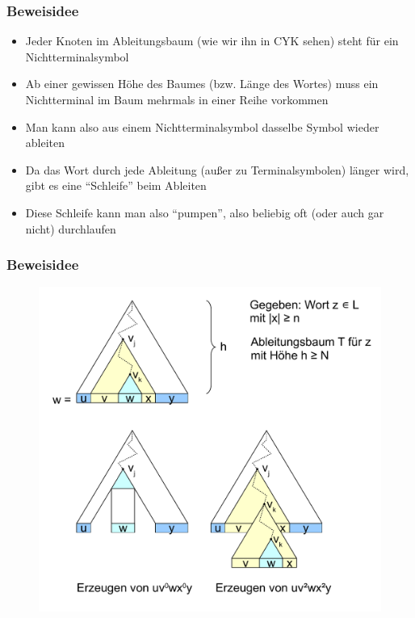 \begin{frame}
	\frametitle{Beweisidee}
	\begin{itemize}
		\item Jeder Knoten im Ableitungsbaum (wie wir ihn in CYK sehen) steht für ein Nichtterminalsymbol
		\item Ab einer gewissen Höhe des Baumes (bzw. Länge des Wortes) muss ein Nichtterminal im Baum mehrmals in einer Reihe vorkommen
		\item Man kann also aus einem Nichtterminalsymbol dasselbe Symbol wieder ableiten
		\item Da das Wort durch jede Ableitung (außer zu Terminalsymbolen) länger wird, gibt es eine "`Schleife"' beim Ableiten
		\item Diese Schleife kann man also "`pumpen"', also beliebig oft (oder auch gar nicht) durchlaufen
	\end{itemize}
\end{frame}

\begin{frame}
	\frametitle{Beweisidee}
	\begin{figure}[H]
		\centering
		\includegraphics[scale=0.41]{images/pumping}
	\end{figure}
\end{frame}

